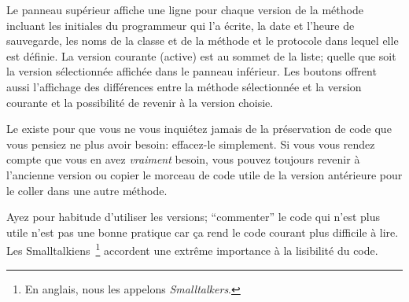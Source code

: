 \documentclass[a4paper,10pt,twoside]{book}
\begin{document}



Le panneau supérieur affiche une ligne pour chaque version de la méthode
incluant les initiales du programmeur qui l'a écrite, la date et l'heure de
sauvegarde, les noms de la classe et de la méthode et le protocole dans 
lequel elle est définie.
La version courante (active) est au sommet de la liste; quelle que soit la version
sélectionnée affichée dans le panneau inférieur.
Les boutons offrent aussi l'affichage des différences entre la méthode sélectionnée et la version courante et la possibilité de revenir à la version choisie.  

Le  existe pour que vous ne vous inquiétez jamais
de la préservation de code que vous pensiez ne plus avoir besoin: effacez-le simplement. 
Si vous vous rendez compte que vous en avez \emph{vraiment} besoin, 
vous pouvez toujours revenir à l'ancienne version ou copier le morceau de 
code utile de la version antérieure pour le coller dans une autre méthode.

Ayez pour habitude d'utiliser les versions; ``commenter'' le code qui n'est 
plus utile n'est pas une bonne pratique car ça rend le code courant plus difficile à lire. 
Les Smalltalkiens~\footnote{En anglais, nous les appelons
 \emph{Smalltalkers}.} accordent une extrême importance à la lisibilité du code.

\end{document}
